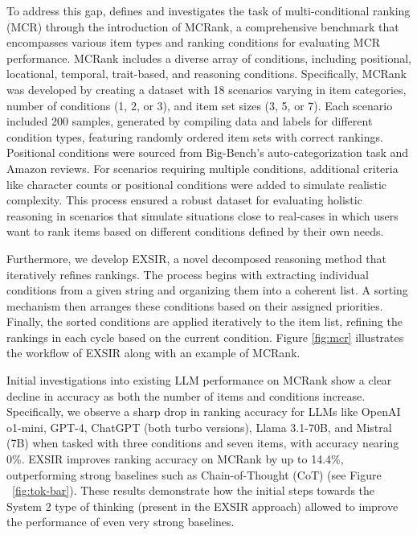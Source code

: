 To address this gap, \cite{pezeshkpour2024multi} defines and investigates the task of multi-conditional ranking (MCR) through the introduction of MCRank, a comprehensive benchmark that encompasses various item types and ranking conditions for evaluating MCR performance. MCRank includes a diverse array of conditions, including positional, locational, temporal, trait-based, and reasoning conditions. Specifically, MCRank was developed by creating a dataset with 18 scenarios varying in item categories, number of conditions (1, 2, or 3), and item set sizes (3, 5, or 7). Each scenario included 200 samples, generated by compiling data and labels for different condition types, featuring randomly ordered item sets with correct rankings. Positional conditions were sourced from Big-Bench's auto-categorization task and Amazon reviews. For scenarios requiring multiple conditions, additional criteria like character counts or positional conditions were added to simulate realistic complexity. This process ensured a robust dataset for evaluating holistic reasoning in scenarios that simulate situations close to real-cases in which users want to rank items based on different conditions defined by their own needs.

Furthermore, we develop EXSIR, a novel decomposed reasoning method that iteratively refines rankings. The process begins with extracting individual conditions from a given string and organizing them into a coherent list. A sorting mechanism then arranges these conditions based on their assigned priorities. Finally, the sorted conditions are applied iteratively to the item list, refining the rankings in each cycle based on the current condition. Figure \ref{fig:mcr} illustrates the workflow of EXSIR along with an example of MCRank.


Initial investigations into existing LLM performance on MCRank show a clear decline in accuracy as both the number of items and conditions increase. Specifically, we observe a sharp drop in ranking accuracy for LLMs like OpenAI o1-mini, GPT-4, ChatGPT (both turbo versions), Llama 3.1-70B, and Mistral (7B) when tasked with three conditions and seven items, with accuracy nearing 0\%.  EXSIR improves ranking accuracy on MCRank by up to 14.4\%, outperforming strong baselines such as Chain-of-Thought (CoT) (see Figure ~\ref{fig:tok-bar}). These results demonstrate how the initial steps towards the System 2 type of thinking (present in the EXSIR approach) allowed to improve the performance of even very strong baselines. 

